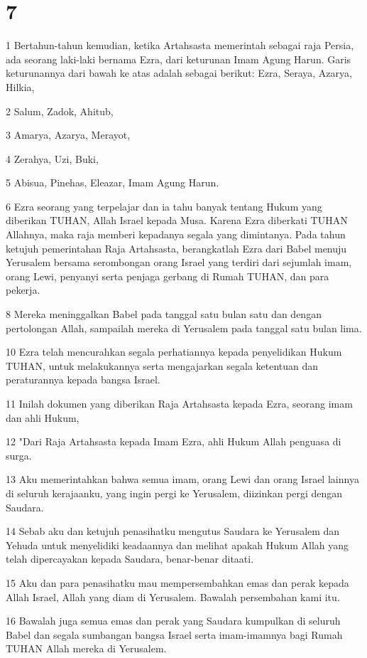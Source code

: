 \chapter{7}

\par 1 Bertahun-tahun kemudian, ketika Artahsasta memerintah sebagai raja Persia, ada seorang laki-laki bernama Ezra, dari keturunan Imam Agung Harun. Garis keturunannya dari bawah ke atas adalah sebagai berikut: Ezra, Seraya, Azarya, Hilkia,
\par 2 Salum, Zadok, Ahitub,
\par 3 Amarya, Azarya, Merayot,
\par 4 Zerahya, Uzi, Buki,
\par 5 Abisua, Pinehas, Eleazar, Imam Agung Harun.
\par 6 Ezra seorang yang terpelajar dan ia tahu banyak tentang Hukum yang diberikan TUHAN, Allah Israel kepada Musa. Karena Ezra diberkati TUHAN Allahnya, maka raja memberi kepadanya segala yang dimintanya. Pada tahun ketujuh pemerintahan Raja Artahsasta, berangkatlah Ezra dari Babel menuju Yerusalem bersama serombongan orang Israel yang terdiri dari sejumlah imam, orang Lewi, penyanyi serta penjaga gerbang di Rumah TUHAN, dan para pekerja.
\par 8 Mereka meninggalkan Babel pada tanggal satu bulan satu dan dengan pertolongan Allah, sampailah mereka di Yerusalem pada tanggal satu bulan lima.
\par 10 Ezra telah mencurahkan segala perhatiannya kepada penyelidikan Hukum TUHAN, untuk melakukannya serta mengajarkan segala ketentuan dan peraturannya kepada bangsa Israel.
\par 11 Inilah dokumen yang diberikan Raja Artahsasta kepada Ezra, seorang imam dan ahli Hukum,
\par 12 "Dari Raja Artahsasta kepada Imam Ezra, ahli Hukum Allah penguasa di surga.
\par 13 Aku memerintahkan bahwa semua imam, orang Lewi dan orang Israel lainnya di seluruh kerajaanku, yang ingin pergi ke Yerusalem, diizinkan pergi dengan Saudara.
\par 14 Sebab aku dan ketujuh penasihatku mengutus Saudara ke Yerusalem dan Yehuda untuk menyelidiki keadaannya dan melihat apakah Hukum Allah yang telah dipercayakan kepada Saudara, benar-benar ditaati.
\par 15 Aku dan para penasihatku mau mempersembahkan emas dan perak kepada Allah Israel, Allah yang diam di Yerusalem. Bawalah persembahan kami itu.
\par 16 Bawalah juga semua emas dan perak yang Saudara kumpulkan di seluruh Babel dan segala sumbangan bangsa Israel serta imam-imamnya bagi Rumah TUHAN Allah mereka di Yerusalem.
